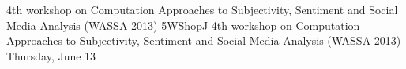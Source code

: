\begin{wsschedule}
{4th workshop on Computation Approaches to Subjectivity, Sentiment and Social Media Analysis (WASSA 2013)}
{5}{WShopJ}
{4th workshop on Computation Approaches to Subjectivity, Sentiment and Social Media Analysis (WASSA 2013)}
{Thursday, June 13}{\WShopLocJ}

\end{wsschedule}

